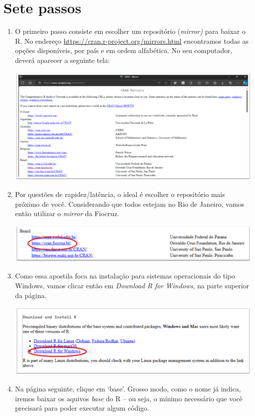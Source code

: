 \documentclass[
  letterpaper,
  DIV=11,
  numbers=noendperiod]{scrreprt}
\begin{document}
\section{Sete passos}\label{sete-passos}

\begin{enumerate}
\def\labelenumi{\arabic{enumi}.}
\item
  O primeiro passo consiste em escolher um repositório (\emph{mirror)}
  para baixar o R. No endereço
  \url{https://cran.r-project.org/mirrors.html} encontramos todas as
  opções disponíveis, por país e em ordem alfabética. No seu computador,
  deverá aparecer a seguinte tela:

  \begin{center}
  \includegraphics{images/clipboard-3074288328.png}
  \end{center}
\item
  Por questões de rapidez/latência, o ideal é escolher o repositório
  mais próximo de você. Considerando que todos estejam no Rio de
  Janeiro, vamos então utilizar o \emph{mirror} da Fiocruz.

  \begin{center}
  \includegraphics{images/clipboard-283220567.png}
  \end{center}
\item
  Como essa apostila foca na instalação para sistemas operacionais do
  tipo Windows, vamos clicar então em \emph{Download R for Windows}, na
  parte superior da página.

  \begin{center}
  \includegraphics{images/clipboard-1477947543.png}
  \end{center}
\item
  Na página seguinte, clique em `base'. Grosso modo, como o nome já
  indica, iremos baixar os aquivos \emph{base} do R -- ou seja, o mínimo
  necessário que você precisará para poder executar algum código.


\end{enumerate}
\end{document}
